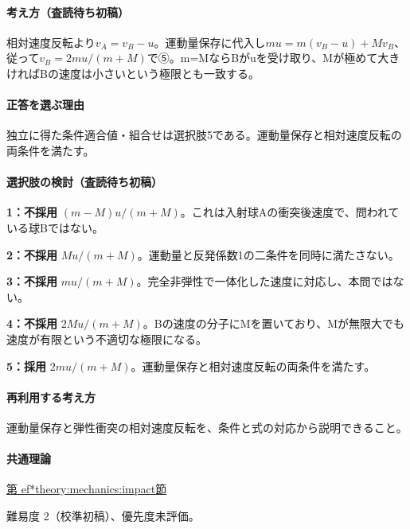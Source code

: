 \paragraph{考え方（査読待ち初稿）} 相対速度反転より\(v_A=v_B-u\)。運動量保存に代入し\(mu=m(v_B-u)+Mv_B\)、従って\(v_B=2mu/(m+M)\)で⑤。m=MならBがuを受け取り、Mが極めて大きければBの速度は小さいという極限とも一致する。

\paragraph{正答を選ぶ理由} 独立に得た条件適合値・組合せは選択肢5である。運動量保存と相対速度反転の両条件を満たす。

\paragraph{選択肢の検討（査読待ち初稿）}

\noindent\textbf{1：不採用} \((m-M)u/(m+M)\)。これは入射球Aの衝突後速度で、問われている球Bではない。\par

\noindent\textbf{2：不採用} \(Mu/(m+M)\)。運動量と反発係数1の二条件を同時に満たさない。\par

\noindent\textbf{3：不採用} \(mu/(m+M)\)。完全非弾性で一体化した速度に対応し、本問ではない。\par

\noindent\textbf{4：不採用} \(2Mu/(m+M)\)。Bの速度の分子にMを置いており、Mが無限大でも速度が有限という不適切な極限になる。\par

\noindent\textbf{5：採用} \(2mu/(m+M)\)。運動量保存と相対速度反転の両条件を満たす。\par

\paragraph{再利用する考え方} 運動量保存と弾性衝突の相対速度反転を、条件と式の対応から説明できること。

\paragraph{共通理論} \hyperref[theory:mechanics:impact]{第
ef*{theory:mechanics:impact}節}

\par 難易度 2（校準初稿）、優先度未評価。

